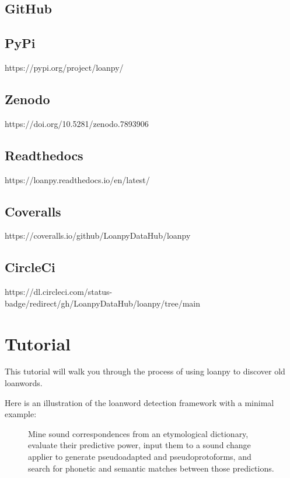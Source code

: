 \documentclass[letterpaper,10pt,english]{sphinxmanual}
\begin{document}
\section{GitHub}
\label{\detokenize{home:github}}


\section{PyPi}
\label{\detokenize{home:pypi}}
https://pypi.org/project/loanpy/


\section{Zenodo}
\label{\detokenize{home:zenodo}}
https://doi.org/10.5281/zenodo.7893906


\section{Readthedocs}
\label{\detokenize{home:readthedocs}}
https://loanpy.readthedocs.io/en/latest/


\section{Coveralls}
\label{\detokenize{home:coveralls}}
https://coveralls.io/github/LoanpyDataHub/loanpy


\section{CircleCi}
\label{\detokenize{home:circleci}}
https://dl.circleci.com/status-badge/redirect/gh/LoanpyDataHub/loanpy/tree/main

\sphinxstepscope


\chapter{Tutorial}
\label{\detokenize{tutorial:tutorial}}\label{\detokenize{tutorial::doc}}
\sphinxAtStartPar
This tutorial will walk you through the process of using loanpy to
discover old loanwords.

\sphinxAtStartPar
Here is an illustration of the loanword detection framework with a minimal
example:

\begin{figure}[htbp]
\centering
\capstart

\noindent{}
\caption{Mine sound
correspondences from an etymological dictionary, evaluate their predictive
power, input them to a sound change applier to generate pseudo\sphinxhyphen{}adapted and
pseudo\sphinxhyphen{}proto\sphinxhyphen{}forms, and search for phonetic and semantic matches between
those predictions.}\label{\detokenize{tutorial:id1}}\end{figure}
\end{document}
